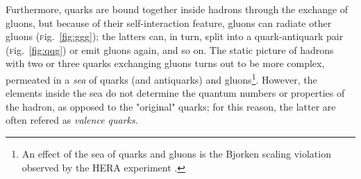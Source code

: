 \documentclass[ALICE,manyauthors]{cernphprep}
\newcommand{\Fig}       {\textsc{f}ig.~}
\newcommand{\fig}       {\Fig}
\begin{document}
Furthermore, quarks are bound together inside hadrons through the exchange of gluons, but because of their self-interaction feature, gluons can radiate other gluons (\fig\ref{fig:ggg}); the latters can, in turn, split into a quark-antiquark pair (\fig\ref{fig:qqg}) or emit gluons again, and so on. The static picture of hadrons  with two or three quarks exchanging gluons turns out to be more complex, permeated in a \textit{sea} of quarks (and antiquarks) and gluons\footnote{An effect of the sea of quarks and gluons is the Bjorken scaling violation observed by the HERA experiment \cite{braibantParticlesFundamentalInteractions2012}\cite{thomsonModernParticlePhysics2013}.}. However, the elements inside the sea do not determine the quantum numbers or properties of the hadron, as opposed to the "original" quarks; for this reason, the latter are often refered as \textit{valence quarks}.
\end{document}
